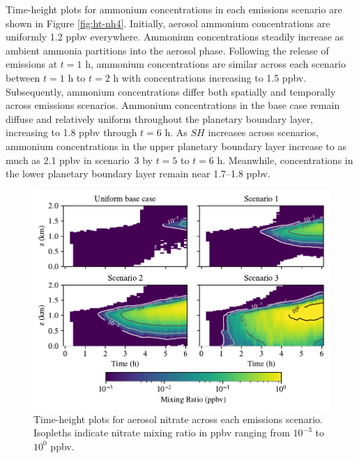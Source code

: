 Time-height plots for ammonium concentrations in each emissions scenario are shown in Figure \ref{fig:ht-nh4}. Initially, aerosol ammonium concentrations are uniformly 1.2 ppbv everywhere. Ammonium concentrations steadily increase as ambient ammonia partitions into the aerosol phase. Following the release of emissions at $t=1$ h, ammonium concentrations are similar across each scenario between $t=1$ h to $t=2$ h with concentrations increasing to 1.5 ppbv. Subsequently, ammonium concentrations differ both spatially and temporally across emissions scenarios. Ammonium concentrations in the base case remain diffuse and relatively uniform throughout the planetary boundary layer, increasing to 1.8 ppbv through $t=6$ h. As $SH$ increases across scenarios, ammonium concentrations in the upper planetary boundary layer increase to as much as 2.1 ppbv in scenario~3 by $t=5$ to $t=6$ h. Meanwhile, concentrations in the lower planetary boundary layer remain near 1.7--1.8 ppbv.

\begin{figure}[!t]
  \centering
    \includegraphics[width=\textwidth]{figures/chapter5/height-time-pmc_NO3-four-scenarios.pdf}
    \caption{Time-height plots for aerosol nitrate across each emissions scenario. Isopleths indicate nitrate mixing ratio in ppbv ranging from $10^{-3}$ to $10^0$ ppbv.}
    \label{fig:ht-no3}
\end{figure}

